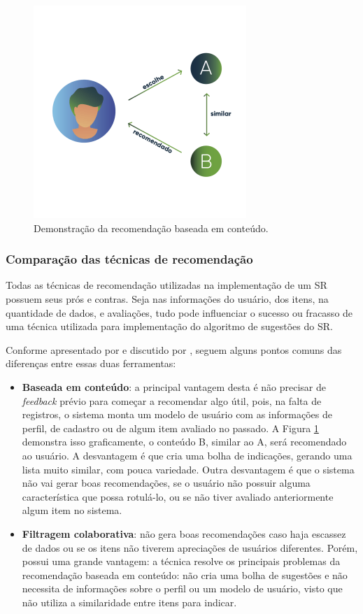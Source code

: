 \documentclass[portuguese]{textolivre}
\begin{document}
\begin{figure}[H]
	\centering
	\includegraphics[scale=0.60]{imagens/fig-026.png}
	\caption{Demonstração da recomendação baseada em conteúdo. }
	\label{fig:002}
\end{figure}


\subsubsection{Comparação das técnicas de recomendação}

Todas as técnicas de recomendação utilizadas na implementação de um SR possuem seus prós e contras. Seja nas informações do usuário, dos itens, na quantidade de dados, e avaliações, tudo pode influenciar o sucesso ou fracasso de uma técnica utilizada para implementação do algoritmo de sugestões do SR.

Conforme apresentado por \textcite{Burke:2007} e discutido por \textcite{Mladenic:1999}, seguem alguns pontos comuns das diferenças entre essas duas ferramentas:

\begin{itemize}
    \item \textbf{Baseada em conteúdo}: a principal vantagem desta é não precisar de \emph{feedback} prévio para começar a recomendar algo útil, pois, na falta de registros, o sistema monta um modelo de usuário com as informações de perfil, de cadastro ou de algum item avaliado no passado. A Figura \ref{fig:002} demonstra isso graficamente, o conteúdo B, similar ao A, será recomendado ao usuário.
    A desvantagem é que cria uma bolha de indicações, gerando uma lista muito similar, com pouca variedade. Outra desvantagem é que o sistema não vai gerar boas recomendações, se o usuário não possuir alguma característica que possa rotulá-lo, ou se não tiver avaliado anteriormente algum item no sistema.
    
    
    \item \textbf{Filtragem colaborativa}: não gera boas recomendações caso haja escassez de dados ou se os itens não tiverem apreciações de usuários diferentes. Porém, possui uma grande vantagem: a técnica resolve os principais problemas da recomendação baseada em conteúdo: não cria uma bolha de sugestões e não necessita de informações sobre o perfil ou um modelo de usuário, visto que não utiliza a similaridade entre itens para indicar.

\end{itemize}
\end{document}
